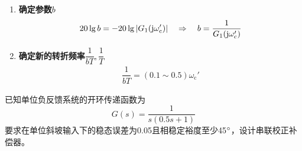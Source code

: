 \begin{enumerate}[1. ]
\begin{enumerate}[\textbf{步骤} 1 ]
		\item \textbf{确定参数$b$}
		\begin{align}
			20 \lg b = -20 \lg |G_1(\text{j} \omega_{\text{c}}')| \quad \Rightarrow \quad b = \dfrac{1}{G_1(\text{j} \omega_{\text{c}}')}
		\end{align}
		
		\item \textbf{确定新的转折频率$\dfrac{1}{bT},\dfrac{1}{T}$}
		\begin{align}
			\dfrac{1}{bT} = (0.1 \sim 0.5)\omega_{\text{c}}'
		\end{align}
	\end{enumerate}
\end{enumerate}

\examples \label{6.2}已知单位负反馈系统的开环传递函数为
\[
G(s) = \dfrac{1}{s(0.5s + 1)}
\]
要求在单位斜坡输入下的稳态误差为0.05且相稳定裕度至少45${}^{\circ}$，设计串联校正补偿器。

